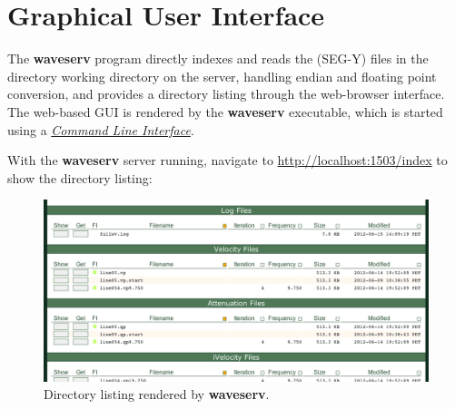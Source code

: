 \documentclass[letterpaper,10pt,english]{sphinxmanual}
\begin{document}
\begin{fulllineitems}
\label{cli:cmdoption-waveserv-g}
\end{fulllineitems}


\begin{fulllineitems}
\label{cli:cmdoption-waveserv-k}
\end{fulllineitems}


\begin{fulllineitems}
\label{cli:cmdoption-waveserv-p}
\end{fulllineitems}



\chapter{Graphical User Interface}
\label{gui:gui}\label{gui::doc}\label{gui:graphical-user-interface}
The \textbf{waveserv} program directly indexes and reads the (SEG-Y) files in the directory working directory on the server, handling endian and floating point conversion, and provides a directory listing through the web-browser interface.  The web-based GUI is rendered by the \textbf{waveserv} executable, which is started using a {\hyperref[cli:cli]{\emph{Command Line Interface}}}.

With the \textbf{waveserv} server running, navigate to \href{http://localhost:1503/index}{http://localhost:1503/index} to show the directory listing:
\begin{figure}[htbp]
\centering
\capstart

\includegraphics{listing.png}
\caption{Directory listing rendered by \textbf{waveserv}.}\end{figure}
\end{document}
